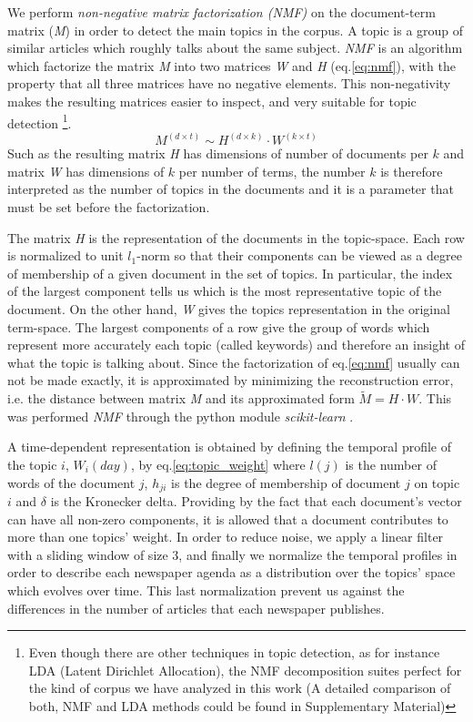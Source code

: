 \documentclass[a4paper, 12pt]{article}
\begin{document}
\par We perform \emph{non-negative matrix factorization (NMF)} \cite{xu2003document, lee1999learning} on the document-term matrix (\emph{M}) in order to detect the main topics in the corpus. A topic is a group of similar articles which roughly talks about the same subject. 
\emph{NMF} is an algorithm which factorize the matrix \emph{M} into two matrices \emph{W} and \emph{H} (eq.\ref{eq:nmf}), with the property that all three matrices have no negative elements. This non-negativity makes the resulting matrices easier to inspect, and very suitable for topic detection \footnote{ Even though there are other techniques in topic detection, as for instance LDA (Latent Dirichlet Allocation), the NMF decomposition suites perfect for the kind of corpus we  have analyzed in this work (A detailed comparison of both, NMF and LDA methods could be found in Supplementary Material)}. 
\begin{equation}
M^{(d \times t)} \sim H^{(d \times k)} \cdot W^{(k \times t)}
\label{eq:nmf}
\end{equation}
Such as the resulting matrix \emph{H} has dimensions of number of documents per $k$ and matrix \emph{W} has dimensions of $k$ per number of terms, the number $k$ is therefore interpreted as the number of topics in the documents and it is a parameter that must be set before the factorization.
\par The matrix \emph{H} is the representation of the documents in the topic-space. Each row is normalized to unit $l_1$-norm so that their components can be viewed as a degree of membership of a given document in the set of topics. In particular, the index of the largest component tells us which is the most representative topic of the document.
On the other hand, \emph{W} gives the topics representation in the original term-space. The largest components of a row give the group of words which represent more accurately each topic (called keywords) and therefore an insight of what the topic is talking about.
Since the factorization of eq.\ref{eq:nmf} usually can not be made exactly, it is approximated by minimizing the reconstruction error, i.e. the distance between matrix \emph{M} and its approximated form $\tilde{M} = H \cdot W$. This was performed \emph{NMF} through the python module \emph{scikit-learn} \cite{scikit-learn}.

\par A time-dependent representation is obtained by defining the temporal profile of the topic $i$, $W_i(day)$, by eq.\ref{eq:topic_weight} where $l(j)$ is the number of words of the document $j$, $h_{ji}$ is the degree of membership of document $j$ on topic $i$ and $\delta$ is the Kronecker delta. Providing by the fact that each document's vector can have all non-zero components, it is allowed that a document contributes to more than one topics' weight.
In order to reduce noise, we apply a linear filter with a sliding window of size 3, and finally we normalize the temporal profiles in order to describe each newspaper agenda as a distribution over the topics' space which evolves over time. This last normalization prevent us against the differences in the number of articles that each newspaper publishes.
\end{document}
